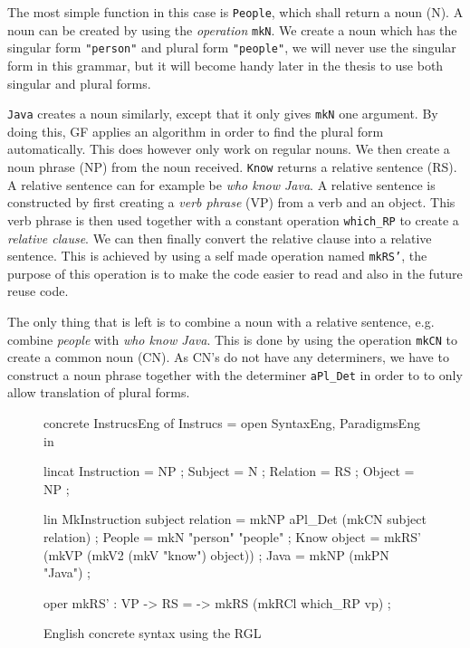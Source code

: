 The most simple function in this case is \texttt{People}, which shall return a noun (N). A noun can be created by using the \emph{operation} \texttt{mkN}. We create a noun which has the singular form \texttt{"person"} and plural form \texttt{"people"}, we will never use the singular form in this grammar, but it will become handy later in the thesis to use both singular and plural forms.

\texttt{Java} creates a noun similarly, except that it only gives \texttt{mkN} one argument. By doing this, GF applies an algorithm in order to find the plural form automatically. This does however only work on regular nouns. We then create a noun phrase (NP) from the noun received.  \texttt{Know} returns a relative sentence (RS). A relative sentence can for example be \emph{who know Java}. A relative sentence is constructed by first creating a \emph{verb phrase} (VP) from a verb and an object. This verb phrase is then used together with a constant operation \texttt{which\_RP} to create a \emph{relative clause}. We can then finally convert the relative clause into a relative sentence. This is achieved by using a self made operation named \texttt{mkRS'}, the purpose of this operation is to make the code easier to read and also in the future reuse code. 

The only thing that is left is to combine a noun with a relative sentence, e.g. combine \emph{people} with \emph{who know Java}. This is done by using the operation \texttt{mkCN} to create a common noun (CN). As CN's do not have any determiners, we have to construct a noun phrase together with the determiner \texttt{aPl\_Det} in order to to only allow translation of plural forms.

\begin{figure}[h]
\begin{code}
concrete InstrucsEng of Instrucs = open SyntaxEng, ParadigmsEng in {
  lincat
    Instruction = NP ;
    Subject = N ;
    Relation = RS ;
    Object = NP ;

  lin
    MkInstruction subject relation = mkNP aPl_Det (mkCN subject relation) ;
    People = mkN "person" "people" ;
    Know object = mkRS' (mkVP (mkV2 (mkV "know") object)) ;
    Java = mkNP (mkPN "Java") ;
    
   oper
      mkRS' : VP -> RS = \vp -> mkRS (mkRCl which_RP vp) ;
}
\end{code}
\caption{English concrete syntax using the RGL\label{fig:english-RGL}}
\end{figure}

